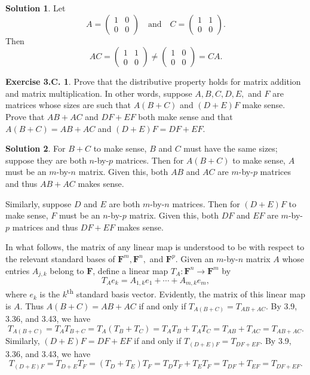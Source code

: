 \documentclass[12pt]{article}
\theoremstyle{definition}
\theoremstyle{exercise}
\newtheorem{exercise}{Exercise 3.C.}
\theoremstyle{solution}
\newtheorem*{solution}{Solution}
\newcommand{\ts}{\textsuperscript}
\newcommand{\quand}{\quad \text{and} \quad}
\newcommand{\F}{\mathbf{F}}
\begin{document}
\begin{solution}
    Let
    \[
        A = \begin{pmatrix}
            1 & 0 \\
            0 & 0
        \end{pmatrix}
        \quand
        C = \begin{pmatrix}
            1 & 1 \\
            0 & 0
        \end{pmatrix}.
    \]
    Then
    \[
        AC = \begin{pmatrix}
            1 & 1 \\
            0 & 0
        \end{pmatrix}
        \neq
        \begin{pmatrix}
            1 & 0 \\
            0 & 0
        \end{pmatrix} = CA.
    \]
\end{solution}

\begin{exercise}
\label{ex:13}
    Prove that the distributive property holds for matrix addition and matrix multiplication. In other words, suppose \( A, B, C, D, E, \) and \( F \) are matrices whose sizes are such that \( A(B + C) \) and \( (D + E)F \) make sense. Prove that \( AB + AC \) and \( DF + EF \) both make sense and that \( A(B + C) = AB + AC \) and \( (D + E)F = DF + EF \).
\end{exercise}

\begin{solution}
    For \( B + C \) to make sense, \( B \) and \( C \) must have the same sizes; suppose they are both \(n\)-by-\(p\) matrices. Then for \( A(B + C) \) to make sense, \( A \) must be an \(m\)-by-\(n\) matrix. Given this, both \( AB \) and \( AC \) are \(m\)-by-\(p\) matrices and thus \( AB + AC \) makes sense.
    
    Similarly, suppose \( D \) and \( E \) are both \(m\)-by-\(n\) matrices. Then for \( (D + E)F \) to make sense, \( F \) must be an \(n\)-by-\(p\) matrix. Given this, both \( DF \) and \( EF \) are \(m\)-by-\(p\) matrices and thus \( DF + EF \) makes sense.
    
    In what follows, the matrix of any linear map is understood to be with respect to the relevant standard bases of \( \F^m, \F^n, \) and \( \F^p \). Given an \(m\)-by-\(n\) matrix \( A \) whose entries \( A_{j,k} \) belong to \( \F \), define a linear map \( T_A : \F^n \to \F^m \) by
    \[
        T_A e_k = A_{1,k} e_1 + \cdots + A_{m,k} e_m,
    \]
    where \( e_k \) is the \(k\)\ts{th} standard basis vector. Evidently, the matrix of this linear map is \( A \). Thus \( A(B + C) = AB + AC \) if and only if \( T_{A(B+C)} = T_{AB + AC} \). By 3.9, 3.36, and 3.43, we have
    \[
        T_{A(B+C)} = T_A T_{B+C} = T_A (T_B + T_C) = T_A T_B + T_A T_C = T_{AB} + T_{AC} = T_{AB + AC}.
    \]
    Similarly, \( (D + E)F = DF + EF \) if and only if \( T_{(D+E)F} = T_{DF + EF} \). By 3.9, 3.36, and 3.43, we have
    \[
        T_{(D+E)F} = T_{D+E} T_F = (T_D + T_E) T_F = T_D T_F + T_E T_F = T_{DF} + T_{EF} = T_{DF + EF}.
    \]
\end{solution}
\end{document}
